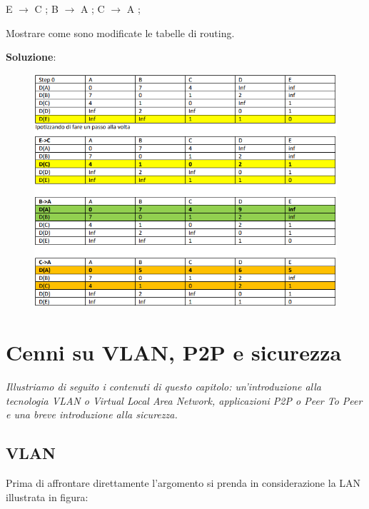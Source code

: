 \documentclass[11pt,a4paper,oneside]{book}
\theoremstyle{definition}
\begin{document}
\begin{enumerate}
\begin{enumerate}
		            E $\rightarrow$ C ; B $\rightarrow$ A ; C $\rightarrow$ A ;

		            Mostrare come sono modificate le tabelle di routing.

		            \textbf{Soluzione}:
		            \begin{figure}[!h]
			            \includegraphics[scale=0.63]{Immagini/Es11_sol.png}
			            \centering
		            \end{figure}
	      \end{enumerate}
	      \pagebreak
\end{enumerate}

\chapter{Cenni su VLAN, P2P e sicurezza}

\textit{Illustriamo di seguito i contenuti di questo capitolo: un'introduzione alla tecnologia VLAN o Virtual Local Area Network, applicazioni P2P o Peer To Peer e una breve introduzione alla sicurezza.}

\section{VLAN}
Prima di affrontare direttamente l'argomento si prenda in considerazione la LAN illustrata in figura:
\end{document}
